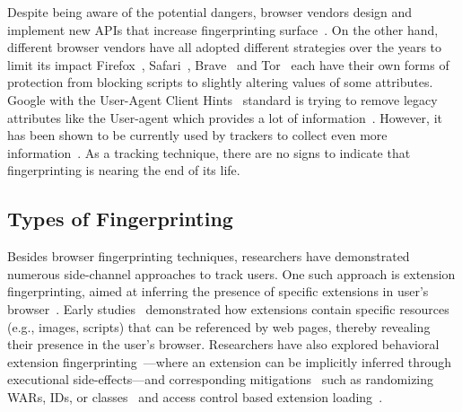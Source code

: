 %
Despite being aware of the potential dangers, browser vendors design and implement new APIs that increase fingerprinting surface~\cite{dotyMitigatingBrowserFingerprinting2019}. 
%
On the other hand, different browser vendors have all adopted different strategies over the years to limit its impact Firefox~\cite{firefoxResistFingerprinting}, Safari~\cite{appledeveloperSafari17Release2023}, Brave~\cite{braveFingerprintingProtectionsBrave2020} and Tor~\cite{torANTIFINGERPRINTINGTorProject} each have their own forms of protection from blocking scripts to slightly altering values of some attributes. 
%
Google with the User-Agent Client Hints~\cite{taylorUserAgentClientHints2024a} standard is trying to remove legacy attributes like the User-agent which provides a lot of information~\cite{laperdrixBeautyBeastDiverting2016}.
%
However, it has been shown to be currently used by trackers to collect even more information~\cite{wieflingPrivacyMeasureTurned2024}. 
%
As a tracking technique, there are no signs to indicate that fingerprinting is nearing the end of its life.



\subsection{Types of Fingerprinting}
\label{sec:types-of-fingerprinting}


Besides browser fingerprinting techniques, researchers have demonstrated numerous side-channel approaches to track users.
%
One such approach is extension fingerprinting, aimed at inferring the presence of specific extensions in user's browser~\cite{karamiCarnusExploringPrivacy2020}. 
%
Early studies~\cite{sjostenDiscoveringBrowserExtensions2017, gulyasExtendNotExtend2018, karamiCarnusExploringPrivacy2020} demonstrated how extensions contain specific resources (e.g., images, scripts) that can be referenced by web pages, thereby revealing their presence in the user's browser. 
%
Researchers have also explored behavioral extension fingerprinting~\cite{starovXHOUNDQuantifyingFingerprintability2017, karamiCarnusExploringPrivacy2020, solomosDangersHumanTouch2022, solomosEscapingConfinesTime2022, laperdrixFingerprintingStyleDetecting2021, agarwalPeekingWindowFingerprinting2024}---where an extension can be implicitly inferred through executional side-effects---and corresponding mitigations~\cite{karamiUnleashSimulacrumShifting2022, sanchez-rolaExtensionBreakdownSecurity2017} such as randomizing WARs, IDs, or classes~\cite{trickelEveryoneDifferentClientside2019} and access control based extension loading~\cite{sjostenLatexGlovesProtecting2019}. 


